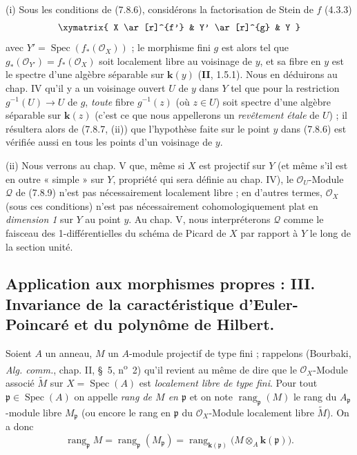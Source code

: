 \begin{remarks}[7.8.10]
\textnormal{(i)} Sous les conditions de (7.8.6), considérons la factorisation de
Stein de $f$ (4.3.3)
\[
\xymatrix{
  X \ar[r]^{f'} & Y' \ar[r]^{g} & Y
}
\]
avec $Y'=\operatorname{Spec}(f_*(\mathscr O_X))$ ; le morphisme fini $g$ est alors
tel que $g_*(\mathscr O_{Y'})=f_*(\mathscr O_X)$ soit localement libre au
voisinage de $y$, et sa fibre en $y$ est le spectre d'une algèbre séparable sur
$\boldsymbol{k}(y)$ (\textbf{II}, 1.5.1). Nous en déduirons au chap. IV qu'il y a un voisinage
ouvert $U$ de $y$ dans $Y$ tel que pour la restriction $g^{-1}(U)\to U$ de $g$,
\emph{toute} fibre $g^{-1}(z)$ (où $z\in U$) soit spectre d'une algèbre séparable
sur $\boldsymbol{k}(z)$ (c'est ce que nous appellerons un \emph{revêtement étale} de
$U$) ; il résultera alors de (7.8.7, (ii)) que l'hypothèse faite sur le point
$y$ dans (7.8.6) est vérifiée aussi en tous les points d'un voisinage de $y$.

\medskip
\textnormal{(ii)} Nous verrons au chap. V que, même si $X$ est projectif sur $Y$
(et même s'il est en outre « simple » sur $Y$, propriété qui sera définie au
chap. IV), le $\mathscr O_U$-Module $\mathscr Q$ de (7.8.9) n'est pas
nécessairement localement libre ; en d'autres termes, $\mathscr O_X$ (sous ces
conditions) n'est pas nécessairement cohomologiquement plat en \emph{dimension
1} sur $Y$ au point $y$. Au chap. V, nous interpréterons $\mathscr Q$ comme le
faisceau des 1-différentielles du schéma de Picard de $X$ par rapport à $Y$ le
long de la section unité.
\end{remarks}

\subsection{Application aux morphismes propres : III. Invariance de la
caractéristique d'Euler-Poincaré et du polynôme de Hilbert.}
\label{subsection:III.7.9.fr}
\label{III.7.9.fr}

\begin{env}[7.9.1]
\label{III.7.9.1.fr}
Soient $A$ un anneau, $M$ un $A$-module projectif de type fini ; rappelons
(Bourbaki, \emph{Alg. comm.}, chap. II, \S~5, n\textsuperscript{o}~2) qu'il
revient au même de dire que le $\mathscr O_X$-Module associé $\widetilde M$ sur
$X=\operatorname{Spec}(A)$ est \emph{localement libre de type fini}. Pour tout
$\mathfrak p\in\operatorname{Spec}(A)$ on appelle \emph{rang de $M$ en
$\mathfrak p$} et on note $\operatorname{rang}_{\mathfrak p}(M)$ le rang du
$A_{\mathfrak p}$-module libre $M_{\mathfrak p}$ (ou encore le rang en
$\mathfrak p$ du $\mathscr O_X$-Module localement libre $\widetilde M$). On a
donc
\[
  \operatorname{rang}_{\mathfrak p}M
  =\operatorname{rang}_{\boldsymbol{\mathfrak p}}(M_{\mathfrak p})
  =\operatorname{rang}_{\mathbf{k}(\mathfrak p)}
  \bigl(M\otimes_A\boldsymbol{k}(\mathfrak p)\bigr).
  \tag{7.9.1.1}\label{III.7.9.1.1.fr}
\]
\end{env}

